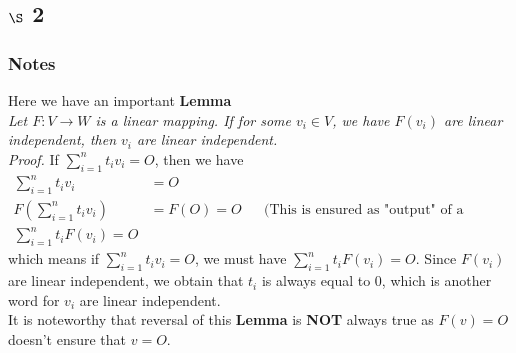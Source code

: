 \documentclass[11pt]{article}
\begin{document}
\subsection{\(\S\) 2}
\label{sec:org59381c7}
\subsubsection{Notes}
\label{sec:org7f26782}
Here we have an important \textbf{Lemma}\\
\emph{Let \(F:V\rightarrow W\) is a linear mapping. If for some \(v_i\in V\), we have \(F(v_i)\) are linear independent, then \(v_i\) are linear independent.}\\
\emph{Proof.} If \(\sum\limits_{i=1}^n t_i v_i=O\), then we have
$$\begin{aligned}
\sum\limits_{i=1}^n t_i v_i&=O\\
F(\sum\limits_{i=1}^n t_i v_i)&=F(O)=O && \text{(This is ensured as "output" of a mapping is unique for same "input")}\\
\sum\limits_{i=1}^n t_i F(v_i)=O
\end{aligned}$$
which means if \(\sum\limits_{i=1}^n t_i v_i=O\), we must have \(\sum\limits_{i=1}^n t_i F(v_i)=O\). Since \(F(v_i)\) are linear independent, we obtain that \(t_i\) is always equal to \(0\), which is another word for \(v_i\) are linear independent.\\
It is noteworthy that reversal of this \textbf{Lemma} is \textbf{NOT} always true as \(F(v)=O\) doesn't ensure that \(v=O\).
\end{document}
